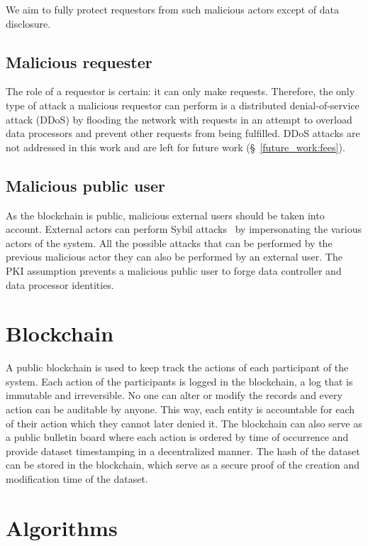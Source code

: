 We aim to fully protect requestors from such malicious actors except of data disclosure.

\subsection{Malicious requester}
\label{solution:treat_model:mrequestor}

The role of a requestor is certain: it can only make requests. Therefore, the only type of attack a malicious requestor can perform is a distributed denial-of-service attack (DDoS) by flooding the network with requests in an attempt to overload  data processors and prevent other requests from being fulfilled. DDoS attacks are not addressed in this work and are left for future work (§~\ref{future_work:fees}).

\subsection{Malicious public user}
\label{solution:treat_model:mpublic_user}

As the blockchain is public, malicious external users should be taken into account. External actors can perform Sybil attacks~\cite{sybil_attack} by impersonating the various actors of the system. All the possible attacks that can be performed by the previous malicious actor they can also be performed by an external user. The PKI assumption prevents a malicious public user to forge data controller and data processor identities.

\section{Blockchain}
\label{solution:blockchain}

Α public blockchain is used to keep track the actions of each participant of the system. Each action of the participants is logged in the blockchain, a log that is immutable and irreversible. No one can alter or modify the records and every action can be auditable by anyone. This way, each entity is accountable for each of their action which they cannot later denied it. The blockchain can also serve as a public bulletin board where each action is ordered by time of occurrence and provide dataset timestamping in a decentralized manner. The hash of the dataset can be stored in the blockchain, which serve as a secure proof of the creation and modification time of the dataset.

\section{Algorithms}
\label{solution:algorithms}


